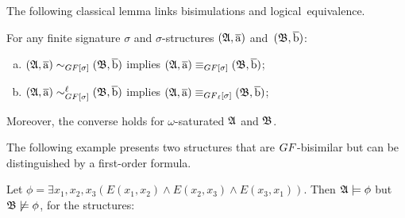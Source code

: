 The following classical lemma links bisimulations and logical~equivalence.
\begin{lemma}\label{lemma:GF-bisimulations-work-well}
For any finite signature $\sigma$ and $\sigma$-structures $({\mathfrak{A}}, \overline{\mathrm{a}})$ and~$({\mathfrak{B}}, \overline{\mathrm{b}})$:
\begin{enumerate}[(a)]
\item $(\str{A}, \elemtuplea) \bisimto_{\GF[\sigma]} (\str{B}, \elemtupleb)$ implies $(\str{A}, \elemtuplea) \equiv_{\GF[\sigma]} (\str{B}, \elemtupleb)$;
\item $(\str{A}, \elemtuplea) \bisimto_{\GF[\sigma]}^{\ell} (\str{B}, \elemtupleb)$ implies $(\str{A}, \elemtuplea) \equiv_{\GF_\ell[\sigma]} (\str{B}, \elemtupleb)$;
\end{enumerate}
Moreover, the converse holds for $\omega$-saturated ${\mathfrak{A}}$ and ${\mathfrak{B}}$.
\end{lemma}

The following example presents two structures that are $\GF$-bisimilar but can be distinguished by a first-order formula.
\begin{example}
  Let $\phi = \exists{x_{1}, x_{2}, x_{3}}(E(x_{1}, x_{2}) \land E(x_{2}, x_{3}) \land E(x_{3}, x_{1}))$. Then ${\mathfrak{A}} \models \phi$ but ${\mathfrak{B}} \not\models \phi$, for the structures:

\end{example}


